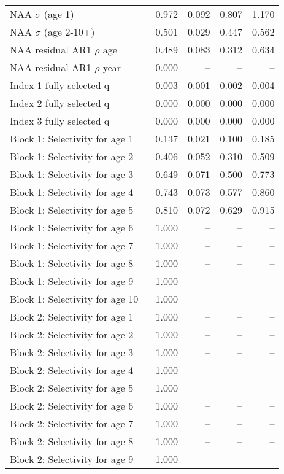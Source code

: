 \documentclass[
]{article}
\begin{document}
\begin{landscape}
\begin{longtable}[t]{lrrrr}
\endfoot
\bottomrule
\endlastfoot
NAA $\sigma$ (age 1) & 0.972 & 0.092 & 0.807 & 1.170\\
NAA $\sigma$ (age 2-10+) & 0.501 & 0.029 & 0.447 & 0.562\\
NAA residual AR1 $\rho$ age & 0.489 & 0.083 & 0.312 & 0.634\\
NAA residual AR1 $\rho$ year & 0.000 & -- & -- & --\\
Index 1 fully selected q & 0.003 & 0.001 & 0.002 & 0.004\\
\addlinespace
Index 2 fully selected q & 0.000 & 0.000 & 0.000 & 0.000\\
Index 3 fully selected q & 0.000 & 0.000 & 0.000 & 0.000\\
Block 1: Selectivity for age 1 & 0.137 & 0.021 & 0.100 & 0.185\\
Block 1: Selectivity for age 2 & 0.406 & 0.052 & 0.310 & 0.509\\
Block 1: Selectivity for age 3 & 0.649 & 0.071 & 0.500 & 0.773\\
\addlinespace
Block 1: Selectivity for age 4 & 0.743 & 0.073 & 0.577 & 0.860\\
Block 1: Selectivity for age 5 & 0.810 & 0.072 & 0.629 & 0.915\\
Block 1: Selectivity for age 6 & 1.000 & -- & -- & --\\
Block 1: Selectivity for age 7 & 1.000 & -- & -- & --\\
Block 1: Selectivity for age 8 & 1.000 & -- & -- & --\\
\addlinespace
Block 1: Selectivity for age 9 & 1.000 & -- & -- & --\\
Block 1: Selectivity for age 10+ & 1.000 & -- & -- & --\\
Block 2: Selectivity for age 1 & 1.000 & -- & -- & --\\
Block 2: Selectivity for age 2 & 1.000 & -- & -- & --\\
Block 2: Selectivity for age 3 & 1.000 & -- & -- & --\\
\addlinespace
Block 2: Selectivity for age 4 & 1.000 & -- & -- & --\\
Block 2: Selectivity for age 5 & 1.000 & -- & -- & --\\
Block 2: Selectivity for age 6 & 1.000 & -- & -- & --\\
Block 2: Selectivity for age 7 & 1.000 & -- & -- & --\\
Block 2: Selectivity for age 8 & 1.000 & -- & -- & --\\
\addlinespace
Block 2: Selectivity for age 9 & 1.000 & -- & -- & --\\

\end{longtable}
\end{landscape}
\end{document}
